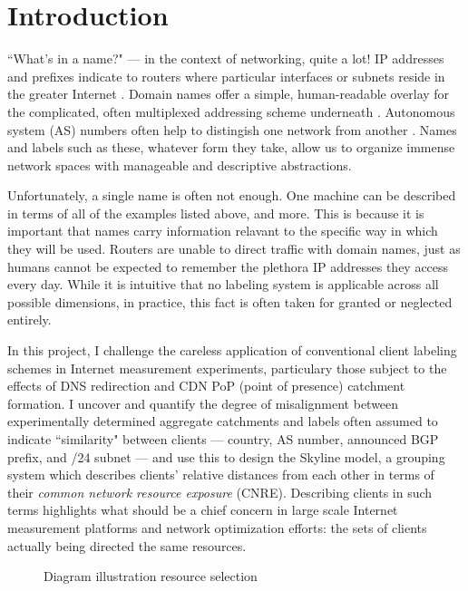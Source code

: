 \section{Introduction} \label{sect:intro}

``What's in a name?" --- in the context of networking, quite a lot! IP addresses and prefixes
indicate to routers where particular interfaces or subnets reside in the greater Internet
\cite{bgp}. Domain
names offer a simple, human-readable overlay for the complicated, often multiplexed addressing
scheme underneath \cite{dns}. Autonomous system (AS) numbers often help to distingish one network
from another \cite{asn}.
Names and labels such as these, whatever form they take, allow us to organize immense network spaces
with manageable and descriptive abstractions.

Unfortunately, a single name is often not enough. One machine can be described in terms of all of
the examples listed above, and more. This is because it is important that names carry information
relavant to the specific way in which they will be used. Routers are unable to direct traffic with
domain names, just as humans cannot be expected to remember the plethora IP addresses they access
every day. While it is intuitive that no labeling system is applicable across all possible
dimensions, in practice, this fact is often taken for granted or neglected entirely.

In this project, I challenge the careless application of conventional client labeling schemes in
Internet measurement experiments, particulary those subject to the effects of DNS redirection and
CDN PoP (point of presence) catchment formation. I uncover and quantify the degree of misalignment
between experimentally determined aggregate catchments and labels often assumed to indicate
``similarity" between clients --- country, AS number, announced BGP prefix, and /24 subnet --- and
use this to design the Skyline model, a grouping system which describes clients' relative distances
from each other in terms of their \emph{common network resource exposure} (CNRE). Describing clients in such
terms highlights what should be a chief concern in large scale Internet measurement platforms and
network optimization efforts: the sets of clients actually being directed the same resources.

\begin{figure}
    \caption{Diagram illustration resource selection}
\end{figure}

